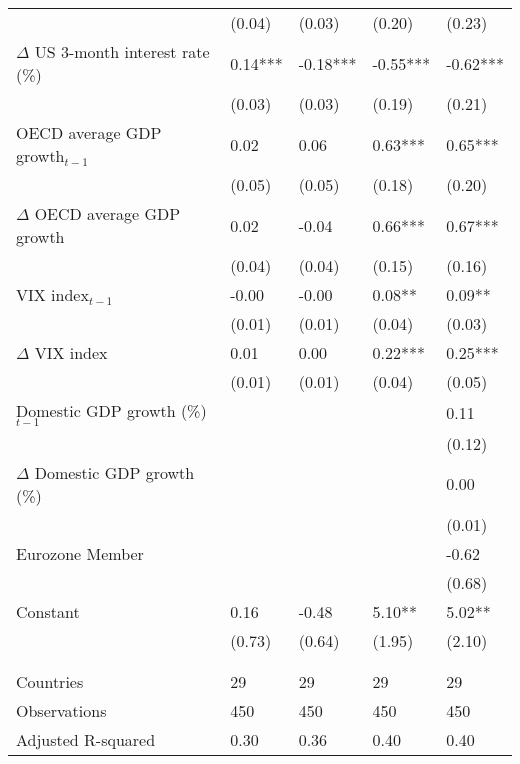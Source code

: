 {\begin{tabular}{lp{2cm}p{2cm}p{2cm}p{2cm}}
   & (0.04) & (0.03) & (0.20) & (0.23) \\ 
  $\Delta$ US 3-month interest rate (\%) & 0.14*** & -0.18*** & -0.55*** & -0.62*** \\ 
   & (0.03) & (0.03) & (0.19) & (0.21) \\ 
  OECD average GDP growth$_{t-1}$ & 0.02 & 0.06 & 0.63*** & 0.65*** \\ 
   & (0.05) & (0.05) & (0.18) & (0.20) \\ 
  $\Delta$ OECD average GDP growth & 0.02 & -0.04 & 0.66*** & 0.67*** \\ 
   & (0.04) & (0.04) & (0.15) & (0.16) \\ 
  VIX index$_{t-1}$ & -0.00 & -0.00 & 0.08** & 0.09** \\ 
   & (0.01) & (0.01) & (0.04) & (0.03) \\ 
  $\Delta$ VIX index & 0.01 & 0.00 & 0.22*** & 0.25*** \\ 
   & (0.01) & (0.01) & (0.04) & (0.05) \\ 
  Domestic GDP growth (\%)$_{t-1}$ &  &  &  & 0.11 \\ 
   &  &  &  & (0.12) \\ 
  $\Delta$ Domestic GDP growth (\%) &  &  &  & 0.00 \\ 
   &  &  &  & (0.01) \\ 
  Eurozone Member &  &  &  & -0.62 \\ 
   &  &  &  & (0.68) \\ 
  Constant & 0.16 & -0.48 & 5.10** & 5.02** \\ 
   & (0.73) & (0.64) & (1.95) & (2.10) \\ 
   &  &  &  &  \\ 
   &  &  &  &  \\ 
  Countries & 29 & 29 & 29 & 29 \\ 
  Observations & 450 & 450 & 450 & 450 \\ 
  Adjusted R-squared & 0.30 & 0.36 & 0.40 & 0.40 \\ 
   \hline
\end{tabular}
}
